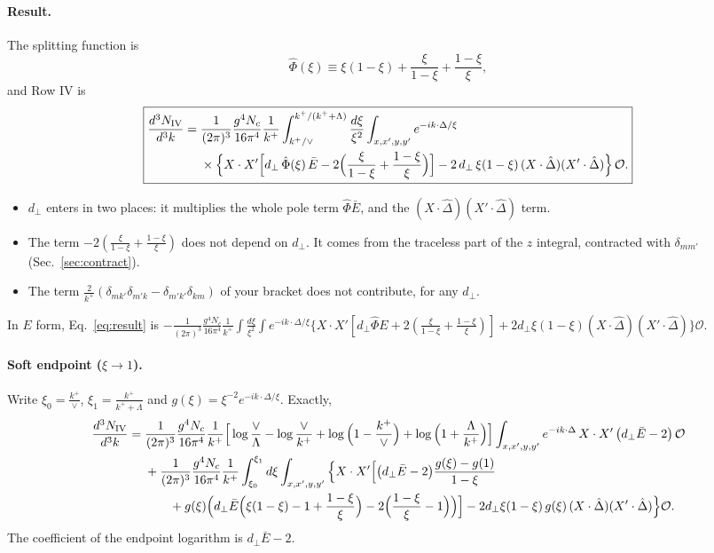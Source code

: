 \documentclass[10pt]{article}
\numberwithin{equation}{section}
\newcommand{\Dh}{\hat\Delta}
\newcommand{\OO}{\mathcal O}
\begin{document}
\paragraph{Result.} The splitting function is
\begin{equation}
\hat\Phi(\xi)\equiv\xi(1-\xi)+\frac{\xi}{1-\xi}+\frac{1-\xi}{\xi},
\end{equation}
and Row IV is
\begin{equation}
\boxed{\begin{aligned}
\frac{d^3N_{\rm IV}}{d^3k}={}&\frac{1}{(2\pi)^3}\frac{g^4N_c}{16\pi^4}\frac{1}{k^+}\int_{k^+/\vee}^{k^+/(k^++\Lambda)}\frac{d\xi}{\xi^2}\int_{x,x',y,y'}e^{-ik\cdot\Delta/\xi}\\
&\times\Big\{X\cdot X'\Big[d_\perp\,\hat\Phi(\xi)\,\bar E-2\Big(\frac{\xi}{1-\xi}+\frac{1-\xi}{\xi}\Big)\Big]-2\,d_\perp\,\xi(1-\xi)\,(X\cdot\Dh)(X'\cdot\Dh)\Big\}\,\OO .
\end{aligned}}
\label{eq:result}
\end{equation}
\begin{itemize}
\item $d_\perp$ enters in two places: it multiplies the whole pole term $\hat\Phi\bar E$, and the $(X\cdot\Dh)(X'\cdot\Dh)$ term.
\item The term $-2(\frac{\xi}{1-\xi}+\frac{1-\xi}{\xi})$ does not depend on $d_\perp$. It comes from the traceless part of the $z$ integral, contracted with $\delta_{mm'}$ (Sec.~\ref{sec:contract}).
\item The term $\frac{2}{k^+}(\delta_{mk'}\delta_{m'k}-\delta_{m'k'}\delta_{km})$ of your bracket does not contribute, for any $d_\perp$.
\end{itemize}
In $E$ form, Eq.~\eqref{eq:result} is $-\frac{1}{(2\pi)^3}\frac{g^4N_c}{16\pi^4}\frac1{k^+}\int\frac{d\xi}{\xi^2}\int e^{-ik\cdot\Delta/\xi}\{X\cdot X'[d_\perp\hat\Phi E+2(\frac{\xi}{1-\xi}+\frac{1-\xi}{\xi})]+2d_\perp\xi(1-\xi)(X\cdot\Dh)(X'\cdot\Dh)\}\OO$.

\paragraph{Soft endpoint ($\xi\to1$).} Write $\xi_0=\frac{k^+}{\vee}$, $\xi_1=\frac{k^+}{k^++\Lambda}$ and $g(\xi)=\xi^{-2}e^{-ik\cdot\Delta/\xi}$. Exactly,
\begin{align}
\frac{d^3N_{\rm IV}}{d^3k}={}&\frac{1}{(2\pi)^3}\frac{g^4N_c}{16\pi^4}\frac{1}{k^+}\Big[\log\frac{\vee}{\Lambda}-\log\frac{\vee}{k^+}+\log\Big(1-\frac{k^+}{\vee}\Big)+\log\Big(1+\frac{\Lambda}{k^+}\Big)\Big]\int_{x,x',y,y'}e^{-ik\cdot\Delta}\,X\cdot X'\,\big(d_\perp\bar E-2\big)\,\OO\notag\\
&+\frac{1}{(2\pi)^3}\frac{g^4N_c}{16\pi^4}\frac{1}{k^+}\int_{\xi_0}^{\xi_1}d\xi\int_{x,x',y,y'}\Big\{X\cdot X'\Big[\big(d_\perp\bar E-2\big)\frac{g(\xi)-g(1)}{1-\xi}\notag\\
&\qquad+g(\xi)\Big(d_\perp\bar E\Big(\xi(1-\xi)-1+\frac{1-\xi}{\xi}\Big)-2\Big(\frac{1-\xi}{\xi}-1\Big)\Big)\Big]-2d_\perp\xi(1-\xi)\,g(\xi)\,(X\cdot\Dh)(X'\cdot\Dh)\Big\}\OO .
\label{eq:endpoint}
\end{align}
The coefficient of the endpoint logarithm is $d_\perp\bar E-2$.
\end{document}
